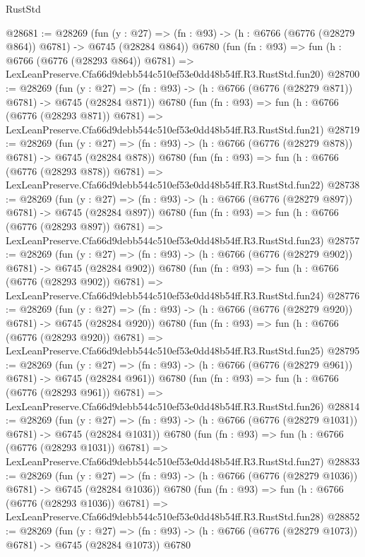 \begin{lexlean}{RustStd}
\begin{coremodule}
@28681 := @28269
    (fun (y : @27) => (fn : @93) -> (h : @6766 (@6776 (@28279 @864)) @6781) -> @6745 (@28284 @864))
    @6780
    (fun (fn : @93) =>
    fun (h : @6766 (@6776 (@28293 @864)) @6781) =>
    LexLeanPreserve.Cfa66d9debb544c510ef53e0dd48b54ff.R3.RustStd.fun20)
@28700 := @28269
    (fun (y : @27) => (fn : @93) -> (h : @6766 (@6776 (@28279 @871)) @6781) -> @6745 (@28284 @871))
    @6780
    (fun (fn : @93) =>
    fun (h : @6766 (@6776 (@28293 @871)) @6781) =>
    LexLeanPreserve.Cfa66d9debb544c510ef53e0dd48b54ff.R3.RustStd.fun21)
@28719 := @28269
    (fun (y : @27) => (fn : @93) -> (h : @6766 (@6776 (@28279 @878)) @6781) -> @6745 (@28284 @878))
    @6780
    (fun (fn : @93) =>
    fun (h : @6766 (@6776 (@28293 @878)) @6781) =>
    LexLeanPreserve.Cfa66d9debb544c510ef53e0dd48b54ff.R3.RustStd.fun22)
@28738 := @28269
    (fun (y : @27) => (fn : @93) -> (h : @6766 (@6776 (@28279 @897)) @6781) -> @6745 (@28284 @897))
    @6780
    (fun (fn : @93) =>
    fun (h : @6766 (@6776 (@28293 @897)) @6781) =>
    LexLeanPreserve.Cfa66d9debb544c510ef53e0dd48b54ff.R3.RustStd.fun23)
@28757 := @28269
    (fun (y : @27) => (fn : @93) -> (h : @6766 (@6776 (@28279 @902)) @6781) -> @6745 (@28284 @902))
    @6780
    (fun (fn : @93) =>
    fun (h : @6766 (@6776 (@28293 @902)) @6781) =>
    LexLeanPreserve.Cfa66d9debb544c510ef53e0dd48b54ff.R3.RustStd.fun24)
@28776 := @28269
    (fun (y : @27) => (fn : @93) -> (h : @6766 (@6776 (@28279 @920)) @6781) -> @6745 (@28284 @920))
    @6780
    (fun (fn : @93) =>
    fun (h : @6766 (@6776 (@28293 @920)) @6781) =>
    LexLeanPreserve.Cfa66d9debb544c510ef53e0dd48b54ff.R3.RustStd.fun25)
@28795 := @28269
    (fun (y : @27) => (fn : @93) -> (h : @6766 (@6776 (@28279 @961)) @6781) -> @6745 (@28284 @961))
    @6780
    (fun (fn : @93) =>
    fun (h : @6766 (@6776 (@28293 @961)) @6781) =>
    LexLeanPreserve.Cfa66d9debb544c510ef53e0dd48b54ff.R3.RustStd.fun26)
@28814 := @28269
    (fun (y : @27) =>
    (fn : @93) -> (h : @6766 (@6776 (@28279 @1031)) @6781) -> @6745 (@28284 @1031))
    @6780
    (fun (fn : @93) =>
    fun (h : @6766 (@6776 (@28293 @1031)) @6781) =>
    LexLeanPreserve.Cfa66d9debb544c510ef53e0dd48b54ff.R3.RustStd.fun27)
@28833 := @28269
    (fun (y : @27) =>
    (fn : @93) -> (h : @6766 (@6776 (@28279 @1036)) @6781) -> @6745 (@28284 @1036))
    @6780
    (fun (fn : @93) =>
    fun (h : @6766 (@6776 (@28293 @1036)) @6781) =>
    LexLeanPreserve.Cfa66d9debb544c510ef53e0dd48b54ff.R3.RustStd.fun28)
@28852 := @28269
    (fun (y : @27) =>
    (fn : @93) -> (h : @6766 (@6776 (@28279 @1073)) @6781) -> @6745 (@28284 @1073))
    @6780

\end{coremodule}
\end{lexlean}

